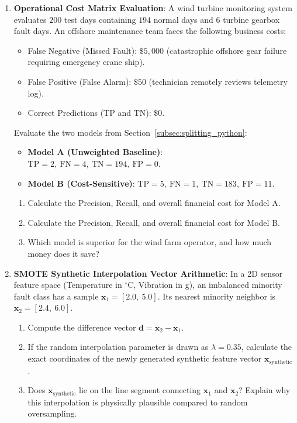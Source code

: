 \begin{checkyourself}
\begin{enumerate}
    \item \textbf{Operational Cost Matrix Evaluation}:
    A wind turbine monitoring system evaluates $200$ test days containing $194$ normal days and $6$ turbine gearbox fault days. An offshore maintenance team faces the following business costs:
    \begin{itemize}
        \item False Negative (Missed Fault): $\$5{,}000$ (catastrophic offshore gear failure requiring emergency crane ship).
        \item False Positive (False Alarm): $\$50$ (technician remotely reviews telemetry log).
        \item Correct Predictions (TP and TN): $\$0$.
    \end{itemize}
    Evaluate the two models from Section~\ref{subsec:splitting_python}:
    \begin{itemize}
        \item \textbf{Model A (Unweighted Baseline)}: $\text{TP} = 2, \ \text{FN} = 4, \ \text{TN} = 194, \ \text{FP} = 0$.
        \item \textbf{Model B (Cost-Sensitive)}: $\text{TP} = 5, \ \text{FN} = 1, \ \text{TN} = 183, \ \text{FP} = 11$.
    \end{itemize}
    \begin{enumerate}[label=(\alph*)]
        \item Calculate the Precision, Recall, and overall financial cost for Model A.
        \item Calculate the Precision, Recall, and overall financial cost for Model B.
        \item Which model is superior for the wind farm operator, and how much money does it save?
    \end{enumerate}

    \item \textbf{SMOTE Synthetic Interpolation Vector Arithmetic}:
    In a 2D sensor feature space (Temperature in $^\circ\text{C}$, Vibration in g), an imbalanced minority fault class has a sample $\mathbf{x}_1 = [2.0, \ 5.0]$. Its nearest minority neighbor is $\mathbf{x}_2 = [2.4, \ 6.0]$.
    \begin{enumerate}[label=(\alph*)]
        \item Compute the difference vector $\mathbf{d} = \mathbf{x}_2 - \mathbf{x}_1$.
        \item If the random interpolation parameter is drawn as $\lambda = 0.35$, calculate the exact coordinates of the newly generated synthetic feature vector $\mathbf{x}_{\text{synthetic}}$.
        \item Does $\mathbf{x}_{\text{synthetic}}$ lie on the line segment connecting $\mathbf{x}_1$ and $\mathbf{x}_2$? Explain why this interpolation is physically plausible compared to random oversampling.
    \end{enumerate}
\end{enumerate}
\end{checkyourself}

